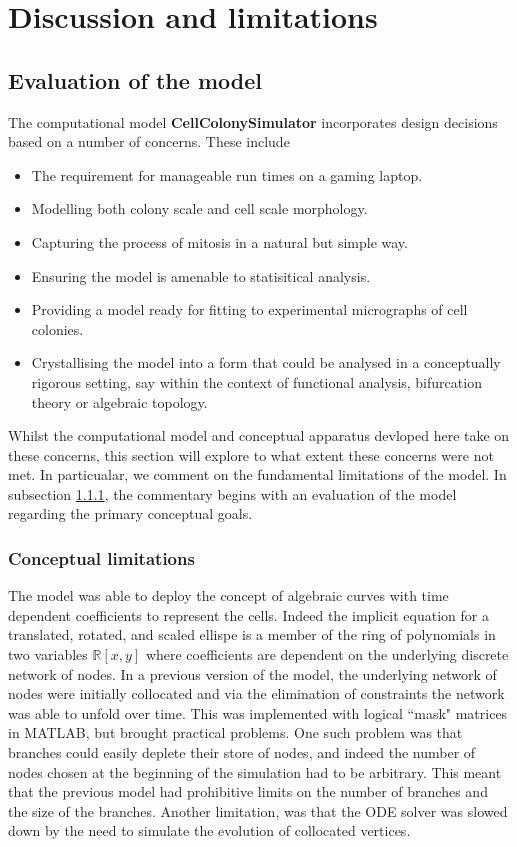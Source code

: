 \chapter{Discussion and limitations}
\section{Evaluation of the model}
The computational model \textbf{CellColonySimulator} incorporates
design decisions based on a number of concerns. These include
\begin{itemize}
    \item The requirement for manageable run times on a gaming laptop.
    \item Modelling both colony scale and cell scale morphology.
    \item Capturing the process of mitosis in a natural but simple way.
    \item Ensuring the model is amenable to statisitical analysis.
    \item Providing a model ready for fitting to experimental micrographs of cell colonies.
    \item Crystallising the model into a form that could be analysed in a conceptually 
          rigorous setting, say within the context of functional analysis,
          bifurcation theory or algebraic topology.
\end{itemize}
Whilst the computational model and conceptual apparatus devloped here take on these concerns,
this section will explore to what extent these concerns were not met. In particualar, we comment on the
fundamental limitations of the model. In subsection \ref{conceptLims}, the commentary begins 
with an evaluation of the model regarding the primary conceptual goals.

\subsection{Conceptual limitations} \label{conceptLims}
The model was able to deploy the concept of algebraic curves with time dependent coefficients 
to represent the cells. Indeed the implicit equation for a translated, rotated, and scaled ellispe 
is a member of the ring of polynomials in two variables $\mathbb{R}[x,y]$ where coefficients are
dependent on the underlying discrete network of nodes. In a previous version of the model, 
the underlying network of nodes were initially collocated and via the elimination 
of constraints the network was able to unfold over time. This was implemented with
logical ``mask" matrices in MATLAB, but 
brought practical problems. One such problem was that branches 
could easily deplete their store of nodes, and indeed the number of nodes
chosen at the beginning of the simulation had to be arbitrary. This meant that
the previous model had prohibitive limits on the number of branches and the size
of the branches. Another limitation, was that the ODE solver was slowed
down by the need to simulate the evolution of collocated vertices.
\\

